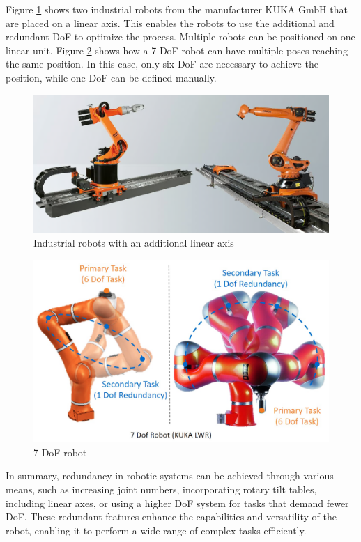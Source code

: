 Figure \ref{linear} shows two industrial robots from the manufacturer KUKA GmbH that are placed on a linear axis. This enables the robots to use the additional and redundant \acrshort{DoF} to optimize the process. Multiple robots can be positioned on one linear unit. 
Figure \ref{seven} shows how a 7-\acrshort{DoF} robot can have multiple poses reaching the same position. In this case, only six \acrshort{DoF} are necessary to achieve the position, while one \acrshort{DoF} can be defined manually.

\begin{figure}[H]
	\centerline{\includegraphics[scale=.4]{figures/linear.png}}
	\caption{Industrial robots with an additional linear axis~\cite{linear}}
	\label{linear}
\end{figure}

\begin{figure}[H]
	\centerline{\includegraphics[scale=.14]{figures/red.png}}
	\caption{7 DoF robot~\cite{Hagane.2022}}
	\label{seven}
\end{figure}

In summary, redundancy in robotic systems can be achieved through various means, such as increasing joint numbers, incorporating rotary tilt tables, including linear axes, or using a higher \acrshort{DoF} system for tasks that demand fewer \acrshort{DoF}. These redundant features enhance the capabilities and versatility of the robot, enabling it to perform a wide range of complex tasks efficiently.

